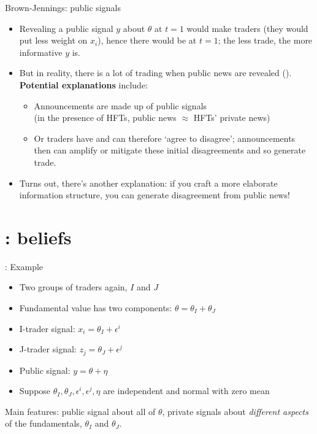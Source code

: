 \documentclass[english,10pt
,aspectratio=169
]{beamer}
\begin{document}
\begin{frame}{Brown-Jennings: public signals}
	\begin{itemize}
		\item Revealing a \alert{public signal $y$} about $\theta$ at $t=1$ would make traders  (they would put less weight on $x_i$), hence there would be  at $t=1$; the less trade, the more informative $y$ is.
		\item But in reality, there is a lot of trading when public news are revealed (\citet*{bailey_economic_2006}). \textbf{Potential explanations} include:
		\begin{itemize}
			\item Announcements are made up of public  signals \\
			(in the presence of HFTs, public news $\approx$ HFTs' private news)
			\item Or traders have  and can therefore `agree to disagree'; announcements then can amplify or mitigate these initial disagreements and so generate trade.
		\end{itemize}
		\item Turns out, there's another explanation: if you craft a more elaborate information structure, you can generate disagreement from public news!
	\end{itemize}
\end{frame}



\section{\cite{kondor_more_2012}: beliefs}

\begin{frame}{\cite{kondor_more_2012}: Example}
	\begin{itemize}
		\item Two groups of traders again, $I$ and $J$
		\item Fundamental value has two components: $\theta=\theta_{I}+\theta_{J}$
		\item I-trader signal: $x_i = \theta_{I}+\epsilon^{i}$
		\item J-trader signal: $z_j = \theta_{J}+\epsilon^{j}$
		\item Public signal: $y = \theta + \eta$
		\item Suppose $\theta_{I},\theta_{J}, \epsilon^{i}, \epsilon^{j}, \eta$ are independent and normal with zero mean
	\end{itemize}
	Main features: public signal about all of $\theta$, private signals about \emph{different aspects} of the fundamentals, $\theta_I$ and $\theta_J$.
\end{frame}
\end{document}
